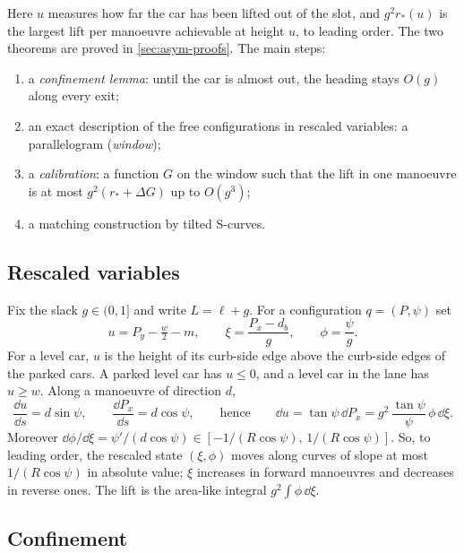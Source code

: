 Here $u$ measures how far the car has been lifted out of the slot, and $g^2r_*(u)$ is the largest lift per manoeuvre achievable at height $u$, to leading order.
The two theorems are proved in \cref{sec:asym-proofs}.
The main steps:
\begin{enumerate}[nosep]
\item a \emph{confinement lemma}: until the car is almost out, the heading stays $O(g)$ along every exit;
\item an exact description of the free configurations in rescaled variables: a parallelogram (\emph{window});
\item a \emph{calibration}: a function $G$ on the window such that the lift in one manoeuvre is at most $g^2(r_*+\Delta G)$ up to $O(g^3)$;
\item a matching construction by tilted S-curves.
\end{enumerate}

\subsection{Rescaled variables}
Fix the slack $g\in(0,1]$ and write $L=\ell+g$.
For a configuration $q=(P,\psi)$ set
\[
  u=P_y-\tfrac w2-m,\qquad \xi=\frac{P_x-d_b}{g},\qquad \phi=\frac{\psi}{g}.
\]
For a level car, $u$ is the height of its curb-side edge above the curb-side edges of the parked cars.
A parked level car has $u\le0$, and a level car in the lane has $u\ge w$.
Along a manoeuvre of direction $d$,
\begin{equation}\label{eq:lift}
  \frac{\dd u}{\dd s}=d\sin\psi,\qquad \frac{\dd P_x}{\dd s}=d\cos\psi,\qquad\text{hence}\qquad \dd u=\tan\psi\,\dd P_x=g^2\,\frac{\tan\psi}{\psi}\,\phi\,\dd\xi .
\end{equation}
Moreover $\dd\phi/\dd\xi=\psi'/(d\cos\psi)\in[-1/(R\cos\psi),\,1/(R\cos\psi)]$.
So, to leading order, the rescaled state $(\xi,\phi)$ moves along curves of slope at most $1/(R\cos\psi)$ in absolute value; $\xi$ increases in forward manoeuvres and decreases in reverse ones.
The lift is the area-like integral $g^2\int\phi\,\dd\xi$.

\subsection{Confinement}

